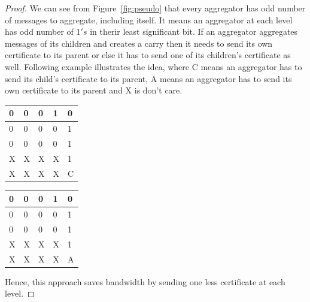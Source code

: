 	\begin{proof}
		We can see from Figure~\ref{fig:pseudo} that every aggregator has odd number of messages to aggregate, including itself.
		It means an aggregator at each level has odd number of $1's$ in therir least significant bit. 
		If an aggregator aggregates messages of its children and creates a carry then it needs to send its own certificate to its parent or else it has to send one of its children's certificate as well.
		Following example illustrates the idea, where C means an aggregator has to send its child's certificate to its parent, A means an aggregator has to send its own certificate to its parent and X is don't care.
		\begin{multicols}{2}
			\begin{tabular}{ l | l l l l }
				0 & 0 & 0 & 1 & 0 \\
				\hline
				0 & 0 & 0 & 0 & 1 \\
				0 & 0 & 0 & 0 & 1 \\
				X & X & X & X & 1 \\
				\hline
				X & X & X & X & C \\
			\end{tabular}
			\columnbreak{|}
			\begin{tabular}{ l | l l l l }
				0 & 0 & 0 & 1 & 0 \\
				\hline
				0 & 0 & 0 & 0 & 1 \\
				0 & 0 & 0 & 0 & 1 \\
				X & X & X & X & 1 \\
				\hline
				X & X & X & X & A \\
			\end{tabular}
		\end{multicols}
		
		Hence, this approach saves bandwidth by sending one less certificate at each level. 
	
	\end{proof}
